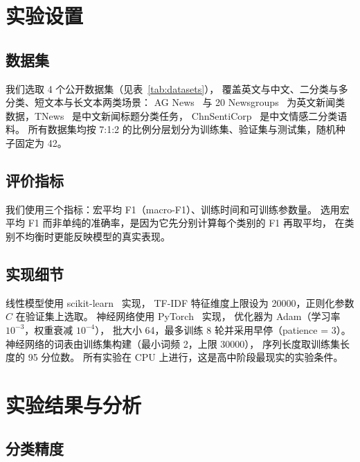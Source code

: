 \documentclass[11pt, a4paper]{ctexart}
\begin{document}
\section{实验设置}

\subsection{数据集}

我们选取 4 个公开数据集（见表~\ref{tab:datasets}），
覆盖英文与中文、二分类与多分类、短文本与长文本两类场景：
AG News~\citep{zhang2015character} 与 20 Newsgroups~\citep{lang1995newsweeder}
为英文新闻类数据，TNews~\citep{xu2020clue} 是中文新闻标题分类任务，
ChnSentiCorp~\citep{tan2008empirical} 是中文情感二分类语料。
所有数据集均按 7:1:2 的比例分层划分为训练集、验证集与测试集，随机种子固定为 42。



\subsection{评价指标}

我们使用三个指标：宏平均 F1（macro-F1）、训练时间和可训练参数量。
选用宏平均 F1 而非单纯的准确率，是因为它先分别计算每个类别的 F1 再取平均，
在类别不均衡时更能反映模型的真实表现。

\subsection{实现细节}

线性模型使用 scikit-learn~\citep{pedregosa2011scikit} 实现，
TF-IDF 特征维度上限设为 20000，正则化参数 $C$ 在验证集上选取。
神经网络使用 PyTorch~\citep{paszke2019pytorch} 实现，
优化器为 Adam（学习率 $10^{-3}$，权重衰减 $10^{-4}$），
批大小 64，最多训练 8 轮并采用早停（patience = 3）。
神经网络的词表由训练集构建（最小词频 2，上限 30000），
序列长度取训练集长度的 95 分位数。
所有实验在 CPU 上进行，这是高中阶段最现实的实验条件。

\section{实验结果与分析}

\subsection{分类精度}
\end{document}
